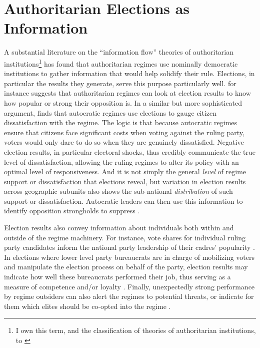 \documentclass[12pt]{article}\usepackage[]{graphicx}\usepackage[]{color}
\newcommand{\1}{\mathbbm{1}}
\begin{document}
\section{Authoritarian Elections as Information}
\label{sec:info}
A substantial literature on the ``information flow'' theories of authoritarian institutions\footnote{I own this term, and the classification of theories of authoritarian institutions, to \cite{Hou2017}} has found that authoritarian regimes use nominally democratic institutions to gather information that would help solidify their rule. Elections, in particular the results they generate, serve this purpose particularly well. \cite{Geddes2005} for instance suggests that authoritarian regimes can look at election results to know how popular or strong their opposition is. In a similar but more sophisticated argument, \cite{Miller2015} finds that autocratic regimes use elections to gauge citizen dissatisfaction with the regime. The logic is that because autocratic regimes ensure that citizens face significant costs when voting against the ruling party, voters would only dare to do so when they are genuinely dissatisfied. Negative election results, in particular electoral shocks, thus credibly communicate the true level of dissatisfaction, allowing the ruling regimes to alter its policy with an optimal level of responsiveness. And it is not simply the general \textit{level} of regime support or dissatisfaction that elections reveal, but variation in election results across geographic subunits also shows the sub-national \textit{distribution} of such support or dissatisfaction. Autocratic leaders can then use this information to identify opposition strongholds to suppress \citep{Magaloni2006, Blaydes2008}.

Election results also convey information about individuals both within and outside of the regime machinery. For instance, vote shares for individual ruling party candidates inform the national party leadership of their cadres' popularity \cite{someone}. In elections where lower level party bureaucrats are in charge of mobilizing voters and manipulate the election process on behalf of the party, election results may indicate how well these bureaucrats performed their job, thus serving as a measure of competence and/or loyalty \citep{Magaloni2006, Blaydes2008}. Finally, unexpectedly strong performance by regime outsiders can also alert the regimes to potential threats, or indicate for them which elites should be co-opted into the regime \cite{LustOkar2005}.
\end{document}
